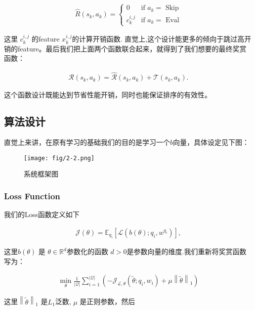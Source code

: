 \begin{align}
\hat{R}(s_k,a_k) = \begin{cases}
0 &\text{if $a_k=$ Skip}\\
c_k^{i,j} &\text{if $a_k=$ Eval}
\end{cases}
\end{align}

这里 $c_k^{i,j}$ 的feature $x^{i,j}_k$的计算开销函数. 直觉上,这个设计能更多的倾向于跳过高开销的feature。最后我们把上面两个函数联合起来，就得到了我们想要的最终奖赏函数：

\begin{align}
\mathcal{R}(s_k,a_k)=\hat{\mathcal{R}}(s_k,a_k)+\mathcal{T}(s_k,a_k).
\end{align}

这个函数设计既能达到节省性能开销，同时也能保证排序的有效性。

\subsection{算法设计}

直觉上来讲，在原有学习的基础我们的目的是学习一个$b$向量，具体设定见下图：

\begin{figure}[!h]
\centering
\texttt{[image: fig/2-2.png]}
\caption{系统框架图}
\end{figure}

\subsubsection{Loss Function}
我们的Loss函数定义如下

\begin{align}
\mathcal{J}(\theta)=\mathbb{E}_{q_i}\left[\mathcal{L}(b(\theta);q_i, w^{q_i})\right],
\end{align}

这里$b(\theta)$ 是 $\theta\in \mathbb{R}^d$参数化的函数 $d>0$是参数向量的维度.我们重新将奖赏函数写为：

\begin{align}
\min\limits_{\theta} \frac{1}{|\mathcal{Q}|} \sum_{i=1}^{|\mathcal{Q}|} \left(-\mathcal{J}_{\mathcal{L}, \theta} \left(\tilde{\theta};q_i,w_i\right)+\mu\left\lVert \tilde{\theta}\right\rVert_1\right)
\end{align}

这里$\left\lVert \tilde{\theta}\right\rVert_1$ 是$L_1$泛数, $\mu$ 是正则参数，然后

